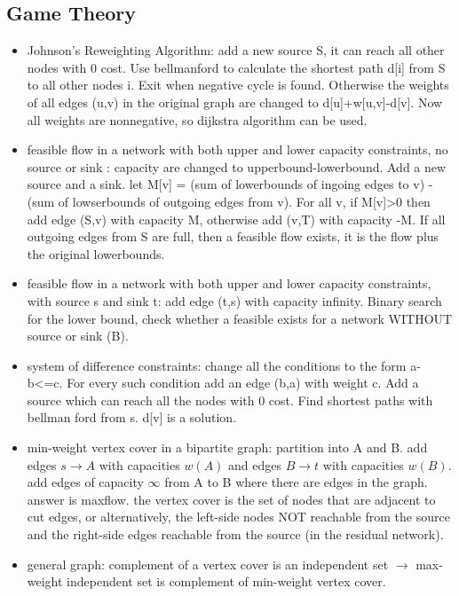 \subsection{Game Theory}

\begin{itemize}
\item Johnson's Reweighting Algorithm: add a new source S, it can reach all other nodes with 0 cost. Use bellmanford to calculate the shortest path d[i] from S to all other nodes i. Exit when negative cycle is found. Otherwise the weights of all edges (u,v) in the original graph are changed to d[u]+w[u,v]-d[v]. Now all weights are nonnegative, so dijkstra algorithm can be used.
\item feasible flow in a network with both upper and lower capacity constraints, no source or sink : capacity are changed to upperbound-lowerbound. Add a new source and a sink. let M[v] = (sum of lowerbounds of ingoing edges to v) - (sum of lowserbounds of outgoing edges from v). For all v, if M[v]>0 then add edge (S,v) with capacity M, otherwise add (v,T) with capacity -M. If all outgoing edges from S are full, then a feasible flow exists, it is the flow plus the original lowerbounds.
\item feasible flow in a network with both upper and lower capacity constraints, with source s and sink t: add edge (t,s) with capacity infinity. Binary search for the lower bound, check whether a feasible exists for a network WITHOUT source or sink (B).
\item system of difference constraints: change all the conditions to the form a-b<=c. For every such condition add an edge (b,a) with weight c. Add a source which can reach all the nodes with 0 cost. Find shortest paths with bellman ford from s. d[v] is a solution.
\item min-weight vertex cover in a bipartite graph: partition into A and B. add edges $s \rightarrow A$ with capacities $w(A)$ and edges $B \rightarrow t$ with capacities $w(B)$. add edges of capacity $\infty$ from A to B where there are edges in the graph. answer is maxflow. the vertex cover is the set of nodes that are
adjacent to cut edges, or alternatively, the left-side nodes NOT reachable from the source and the right-side edges reachable from the source (in the residual network).
\item general graph: complement of a vertex cover is an independent set $\rightarrow$ max-weight independent set is complement of min-weight vertex cover.

\end{itemize}
